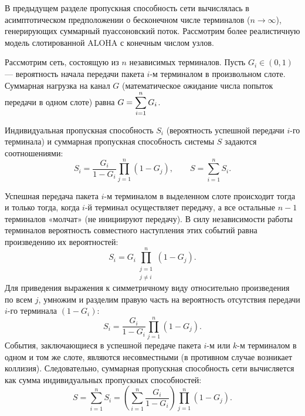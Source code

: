 В предыдущем разделе пропускная способность сети вычислялась в асимптотическом предположении о бесконечном числе терминалов ($n \to \infty$), генерирующих суммарный пуассоновский поток. Рассмотрим более реалистичную модель слотированной ALOHA с конечным числом узлов.

\begin{statement}
Рассмотрим сеть, состоящую из $n$ независимых терминалов. Пусть $G_i \in (0, 1)$ --- вероятность начала передачи пакета $i$-м терминалом в произвольном слоте. Суммарная нагрузка на канал $G$ (математическое ожидание числа попыток передачи в одном слоте) равна $G = \displaystyle \sum_{i=1}^{n} G_i$.

Индивидуальная пропускная способность $S_i$ (вероятность успешной передачи $i$-го терминала) и суммарная пропускная способность системы $S$ задаются соотношениями:
$$
S_i = \frac{G_i}{1 - G_i} \prod_{j=1}^{n} (1 - G_j), \qquad S = \sum_{i=1}^{n} S_i.
$$
\end{statement}

\begin{sproof}
Успешная передача пакета $i$-м терминалом в выделенном слоте происходит тогда и только тогда, когда $i$-й терминал осуществляет передачу, а все остальные $n-1$ терминалов «молчат» (не инициируют передачу). В силу независимости работы терминалов вероятность совместного наступления этих событий равна произведению их вероятностей:
$$
S_i = G_i \prod_{\substack{j=1 \\ j \neq i}}^{n} (1 - G_j).
$$
Для приведения выражения к симметричному виду относительно произведения по всем $j$, умножим и разделим правую часть на вероятность отсутствия передачи $i$-го терминала $(1 - G_i)$:
$$
S_i = \frac{G_i}{1 - G_i} \prod_{j=1}^{n} (1 - G_j).
$$
События, заключающиеся в успешной передаче пакета $i$-м или $k$-м терминалом в одном и том же слоте, являются несовместными (в противном случае возникает коллизия). Следовательно, суммарная пропускная способность сети вычисляется как сумма индивидуальных пропускных способностей:
$$
S = \sum_{i=1}^{n} S_i = \left( \sum_{i=1}^{n} \frac{G_i}{1 - G_i} \right) \prod_{j=1}^{n} (1 - G_j).
$$
\end{sproof}

